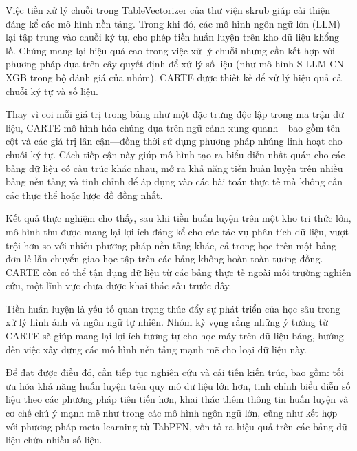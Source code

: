 \documentclass{article}
\begin{document}
Việc tiền xử lý chuỗi trong TableVectorizer của thư viện skrub giúp cải thiện đáng kể các mô hình nền tảng. Trong khi đó, các mô hình ngôn ngữ lớn (LLM) lại tập trung vào chuỗi ký tự, cho phép tiền huấn luyện trên kho dữ liệu khổng lồ. Chúng mang lại hiệu quả cao trong việc xử lý chuỗi nhưng cần kết hợp với phương pháp dựa trên cây quyết định để xử lý số liệu (như mô hình S-LLM-CN-XGB trong bộ đánh giá của nhóm). CARTE được thiết kế để xử lý hiệu quả cả chuỗi ký tự và số liệu.

Thay vì coi mỗi giá trị trong bảng như một đặc trưng độc lập trong ma trận dữ liệu, CARTE mô hình hóa chúng dựa trên ngữ cảnh xung quanh—bao gồm tên cột và các giá trị lân cận—đồng thời sử dụng phương pháp nhúng linh hoạt cho chuỗi ký tự. Cách tiếp cận này giúp mô hình tạo ra biểu diễn nhất quán cho các bảng dữ liệu có cấu trúc khác nhau, mở ra khả năng tiền huấn luyện trên nhiều bảng nền tảng và tinh chỉnh để áp dụng vào các bài toán thực tế mà không cần các thực thể hoặc lược đồ đồng nhất.

Kết quả thực nghiệm cho thấy, sau khi tiền huấn luyện trên một kho tri thức lớn, mô hình thu được mang lại lợi ích đáng kể cho các tác vụ phân tích dữ liệu, vượt trội hơn so với nhiều phương pháp nền tảng khác, cả trong học trên một bảng đơn lẻ lẫn chuyển giao học tập trên các bảng không hoàn toàn tương đồng. CARTE còn có thể tận dụng dữ liệu từ các bảng thực tế ngoài môi trường nghiên cứu, một lĩnh vực chưa được khai thác sâu trước đây.

Tiền huấn luyện là yếu tố quan trọng thúc đẩy sự phát triển của học sâu trong xử lý hình ảnh và ngôn ngữ tự nhiên. Nhóm kỳ vọng rằng những ý tưởng từ CARTE sẽ giúp mang lại lợi ích tương tự cho học máy trên dữ liệu bảng, hướng đến việc xây dựng các mô hình nền tảng mạnh mẽ cho loại dữ liệu này.

Để đạt được điều đó, cần tiếp tục nghiên cứu và cải tiến kiến trúc, bao gồm: tối ưu hóa khả năng huấn luyện trên quy mô dữ liệu lớn hơn, tinh chỉnh biểu diễn số liệu theo các phương pháp tiên tiến hơn, khai thác thêm thông tin huấn luyện và cơ chế chú ý mạnh mẽ như trong các mô hình ngôn ngữ lớn, cũng như kết hợp với phương pháp meta-learning từ TabPFN, vốn tỏ ra hiệu quả trên các bảng dữ liệu chứa nhiều số liệu.

\end{document}
